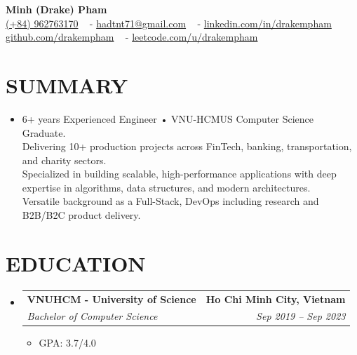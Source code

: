 \documentclass[letterpaper,11pt]{article}
\makeatletter
\newcommand{\resumeSubheading}[4]{
  \vspace{-2pt}\item
    \begin{tabular*}{1.0\textwidth}[t]{l@{\extracolsep{\fill}}r}
      \textbf{\large#1} & \textbf{\small #2} \\
      \textit{\large#3} & \textit{\small #4} \\
      
    \end{tabular*}\vspace{-7pt}
}
\newcommand{\resumeSubHeadingListStart}{\begin{itemize}[leftmargin=0.0in, label={}]}
\newcommand{\resumeSubHeadingListEnd}{\end{itemize}}
\newcommand{\resumeItemListStart}{\begin{itemize}[leftmargin=0.1in]}
\newcommand{\resumeItemListEnd}{\end{itemize}\vspace{-5pt}}
\makeatother
\begin{document}

\begin{center}
    {\huge \textbf{Minh (Drake) Pham}} \\ \vspace{5pt} 
    \small
    \href{tel:+84962763170}{(+84) 962763170} ~ \small{-}
    \href{mailto:hadtnt71@gmail.com}{hadtnt71@gmail.com} ~ \small{-}
    \href{https://www.linkedin.com/in/drakempham/}{linkedin.com/in/drakempham} \\ \vspace{2pt}
    \href{https://github.com/drakempham}{github.com/drakempham} ~ \small{-}
    \href{https://leetcode.com/u/drakempham/}{leetcode.com/u/drakempham}
    \vspace{-7pt}
\end{center}

\section{\color{airforceblue}SUMMARY}

\resumeSubHeadingListStart
    \item[] \small{ %
        6+ years Experienced Engineer • VNU-HCMUS Computer Science Graduate. \\
        Delivering 10+ production projects across FinTech, banking, transportation, and charity sectors. \\
        Specialized in building scalable, high-performance applications with deep expertise in algorithms, data structures, and modern architectures. \\Versatile background as a Full-Stack, DevOps including research and B2B/B2C product delivery.\\
    }
\resumeSubHeadingListEnd

\vspace{-10pt} %

\section{\color{airforceblue}EDUCATION}
  \resumeSubHeadingListStart
    \resumeSubheading
      {VNUHCM - University of Science}{Ho Chi Minh City, Vietnam}
      {Bachelor of Computer Science}{Sep 2019 -- Sep 2023}
      \resumeItemListStart
        \item[] \small{GPA: 3.7/4.0}
      \resumeItemListEnd
  \resumeSubHeadingListEnd
\end{document}
